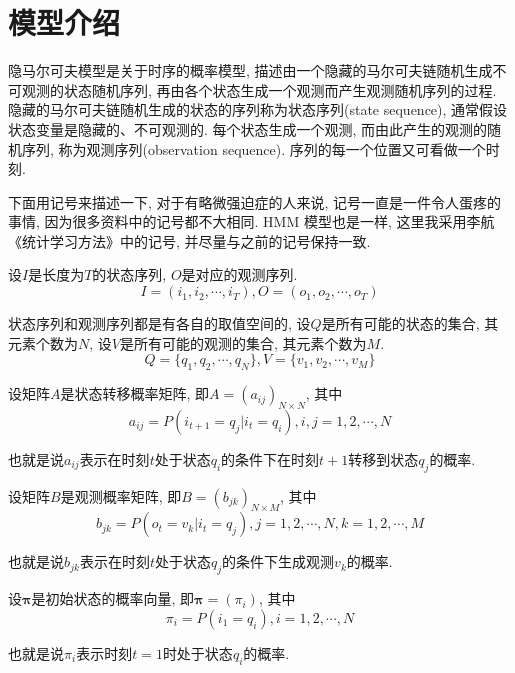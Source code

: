\documentclass[a4paper,UTF8]{ctexart}
\theoremstyle{plain} \newtheorem{theorem}{定理}[section]
\theoremstyle{plain} \newtheorem{definition}{定义}[section]
\theoremstyle{plain} \newtheorem{lemma}{引理}[section]
\theoremstyle{plain} \newtheorem{proposition}{命题}[section]
\theoremstyle{plain} \newtheorem{example}{例}[section]
\theoremstyle{plain} \newtheorem{remark}{注}[section]
\theoremstyle{plain} \newtheorem{corollary}{推论}[section]
\begin{document}
\section{模型介绍}
隐马尔可夫模型是关于时序的概率模型, 描述由一个隐藏的马尔可夫链随机生成不可观测的状态随机序列, 再由各个状态生成一个观测而产生观测随机序列的过程. 隐藏的马尔可夫链随机生成的状态的序列称为状态序列(state sequence), 通常假设状态变量是隐藏的、不可观测的. 每个状态生成一个观测, 而由此产生的观测的随机序列, 称为观测序列(observation sequence). 序列的每一个位置又可看做一个时刻. 

下面用记号来描述一下, 对于有略微强迫症的人来说, 记号一直是一件令人蛋疼的事情, 因为很多资料中的记号都不大相同. HMM 模型也是一样, 这里我采用李航《统计学习方法》中的记号, 并尽量与之前的记号保持一致.

设$I$是长度为$T$的状态序列, $O$是对应的观测序列.
\begin{equation*}
I = (i_1, i_2, \cdots, i_T), O = (o_1, o_2, \cdots, o_T)
\end{equation*}

状态序列和观测序列都是有各自的取值空间的, 设$Q$是所有可能的状态的集合, 其元素个数为$N$, 设$V$是所有可能的观测的集合, 其元素个数为$M$.
\begin{equation*}
Q = \{q_1, q_2, \cdots, q_N\}, V = \{v_1, v_2, \cdots, v_M\}
\end{equation*}

设矩阵$A$是状态转移概率矩阵, 即$A = (a_{ij})_{N \times N}$, 其中
\begin{equation*}
a_{ij} = P(i_{t+1} = q_{j} | i_{t} = q_{i}), i, j = 1, 2, \cdots, N
\end{equation*}

也就是说$a_{ij}$表示在时刻$t$处于状态$q_{i}$的条件下在时刻$t+1$转移到状态$q_{j}$的概率.

设矩阵$B$是观测概率矩阵, 即$B = (b_{jk})_{N \times M}$, 其中
\begin{equation*}
b_{jk} = P(o_{t} = v_{k} | i_{t} = q_{j}), j = 1,2, \cdots, N, k = 1,2, \cdots,M
\end{equation*}

也就是说$b_{jk}$表示在时刻$t$处于状态$q_{j}$的条件下生成观测$v_{k}$的概率.

设$\bm{\pi}$是初始状态的概率向量, 即$\bm{\pi} = (\pi_i)$, 其中
\begin{equation*}
\pi_{i} = P(i_{1} = q_{i}), i = 1,2,\cdots,N
\end{equation*}

也就是说$\pi_{i}$表示时刻$t=1$时处于状态$q_{i}$的概率.
\end{document}
